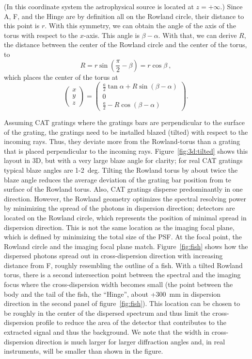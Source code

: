 \documentclass[linenumbers]{aastex631}
\begin{document}
(In this coordinate system the astrophysical source is located at $z=+\infty$.)
Since A, F, and the Hinge are by definition all on the Rowland circle, their distance to this point is $r$. With this symmetry, we can obtain the angle of the axis of the torus with respect to the $x$-axis. This angle is $\beta-\alpha$. With that, we can derive $R$, the distance between the center of the Rowland circle and the center of the torus, to
\begin{equation}
    R = r \sin\left(\frac{\pi}{2} - \beta\right) = r \cos\beta\ ,
\end{equation}
which places the center of the torus at
\begin{equation}
    \begin{pmatrix} x \\ y \\ z \end{pmatrix} =
    \begin{pmatrix} \frac{a}{2}\tan{\alpha}+R\sin{(\beta-\alpha)} \\ 0 \\
        \frac{a}{2}-R\cos{(\beta-\alpha)} \end{pmatrix}.
\end{equation}

Assuming CAT gratings where the gratings bars are perpendicular to the surface of the grating, the gratings need to be installed blazed (tilted) with respect to the incoming rays. Thus, they deviate more from the Rowland-torus than a grating that is placed perpendicular to the incoming rays. Figure~\ref{fig:3d:tilted} shows this layout in 3D, but with a very large blaze angle for clarity; for real CAT gratings typical blaze angles are 1-2~deg. Tilting the Rowland torus by about twice the blaze angle reduces the average deviation of the grating bar position from te surface of the Rowland torus. Also, CAT gratings disperse predominantly in one direction. However, the Rowland geometry optimizes the spectral resolving power by minimizing the spread of the photons in dispersion direction; detectors are located on the Rowland circle, which represents the position of minimal spread in dispersion direction. This is not the same location as the imaging focal plane, which is defined by minimizing the total size of the PSF. At the focal point, the Rowland circle and the imaging focal plane match. Figure~\ref{fig:fish} shows how the dispersed photons spread out in cross-dispersion direction with increasing distance from F, roughly resembling the outline of a fish. With a tilted Rowland torus, there is a second intersection point between the spectral and the imaging focus where the cross-dispersion width becomes small (the point between the body and the tail of the fish, the ``Hinge'', about +300~mm in dispersion direction in the second panel of figure~\ref{fig:fish}). This location can be chosen to be roughly in the center of the dispersed spectrum and thus limit the cross-dispersion profile to reduce the area of the detector that contributes to the extracted signal and thus the background. We note that the width in cross-dispersion direction is much larger for larger diffraction angles and, in real instruments, will be smaller than shown in the figure.
\end{document}
